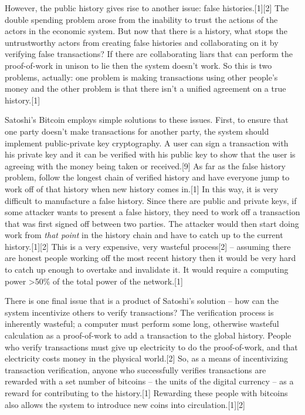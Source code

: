 \documentclass[pdftex,11pt]{article}
\begin{document}
However, the public history gives rise to another issue: false histories.[1][2] The double spending problem arose from the inability to trust the actions of the actors in the economic system. But now that there is a history, what stops the untrustworthy actors from creating false histories and collaborating on it by verifying false transactions?  If there are collaborating liars that can perform the proof-of-work in unison to lie then the system doesn't work. So this is two problems, actually: one problem is making transactions using other people's money and the other problem is that there isn't a unified agreement on a true history.[1]

Satoshi's Bitcoin employs simple solutions to these issues. First, to ensure that one party doesn't make transactions for another party, the system should implement public-private key cryptography. A user can sign a transaction with his private key and it can be verified with his public key to show that the user is agreeing with the money being taken or received.[9] As far as the false history problem, follow the longest chain of verified history and have everyone jump to work off of that history when new history comes in.[1] In this way, it is very difficult to manufacture a false history. Since there are public and private keys, if some attacker wants to present a false history, they need to work off a transaction that was first signed off between two parties. The attacker would then start doing work from {\em that point} in the history chain and have to catch up to the current history.[1][2] This is a very expensive, very wasteful process[2] -- assuming there are honest people working off the most recent history then it would be very hard to catch up enough to overtake and invalidate it. It would require a computing power >50\% of the total power of the network.[1]

There is one final issue that is a product of Satoshi's solution -- how can the system incentivize others to verify transactions? The verification process is inherently wasteful; a computer must perform some long, otherwise wasteful calculation as a proof-of-work to add a transaction to the global history. People who verify transactions must give up electricity to do the proof-of-work, and that electricity costs money in the physical world.[2] So, as a means of incentivizing transaction verification, anyone who successfully verifies transactions are rewarded with a set number of bitcoins -- the units of the digital currency -- as a reward for contributing to the history.[1] Rewarding these people with bitcoins also allows the system to introduce new coins into circulation.[1][2]
\end{document}
